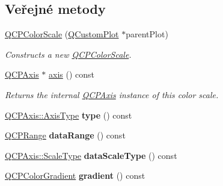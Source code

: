 \subsection*{Veřejné metody}
\begin{DoxyCompactItemize}
\item 
\hypertarget{classQCPColorScale_aa8debce1be38b54287c04d4f584394b4}{}\hyperlink{classQCPColorScale_aa8debce1be38b54287c04d4f584394b4}{Q\+C\+P\+Color\+Scale} (\hyperlink{classQCustomPlot}{Q\+Custom\+Plot} $\ast$parent\+Plot)\label{classQCPColorScale_aa8debce1be38b54287c04d4f584394b4}

\begin{DoxyCompactList}\small\item\em Constructs a new \hyperlink{classQCPColorScale}{Q\+C\+P\+Color\+Scale}. \end{DoxyCompactList}\item 
\hyperlink{classQCPAxis}{Q\+C\+P\+Axis} $\ast$ \hyperlink{classQCPColorScale_a1205bd67c8a33d5818aac1f6eea016a4}{axis} () const 
\begin{DoxyCompactList}\small\item\em Returns the internal \hyperlink{classQCPAxis}{Q\+C\+P\+Axis} instance of this color scale. \end{DoxyCompactList}\item 
\hypertarget{classQCPColorScale_a9a5236328c97fbfde01e3d91c4fcce6a}{}\hyperlink{classQCPAxis_ae2bcc1728b382f10f064612b368bc18a}{Q\+C\+P\+Axis\+::\+Axis\+Type} {\bfseries type} () const \label{classQCPColorScale_a9a5236328c97fbfde01e3d91c4fcce6a}

\item 
\hypertarget{classQCPColorScale_a52134696d5e04074fff4227d92d96f7b}{}\hyperlink{classQCPRange}{Q\+C\+P\+Range} {\bfseries data\+Range} () const \label{classQCPColorScale_a52134696d5e04074fff4227d92d96f7b}

\item 
\hypertarget{classQCPColorScale_a9718c004421811be97e683d7f7d7ee61}{}\hyperlink{classQCPAxis_a36d8e8658dbaa179bf2aeb973db2d6f0}{Q\+C\+P\+Axis\+::\+Scale\+Type} {\bfseries data\+Scale\+Type} () const \label{classQCPColorScale_a9718c004421811be97e683d7f7d7ee61}

\item 
\hypertarget{classQCPColorScale_ac71a6cd853c97a2dbfd32f67afd399df}{}\hyperlink{classQCPColorGradient}{Q\+C\+P\+Color\+Gradient} {\bfseries gradient} () const \label{classQCPColorScale_ac71a6cd853c97a2dbfd32f67afd399df}


\end{DoxyCompactItemize}
